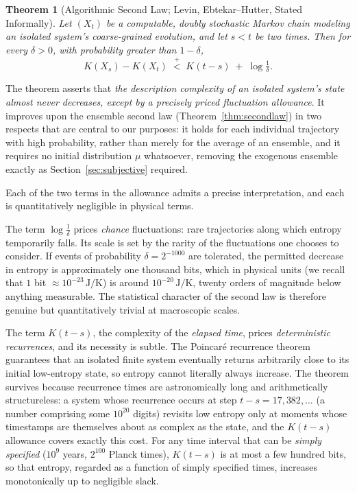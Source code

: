\documentclass[10pt]{article}
\newtheorem{theorem}{Theorem}[section]
\theoremstyle{definition}
\theoremstyle{remark}
\newcommand{\plt}{\mathrel{\stackrel{+}{<}}}
\begin{document}
\begin{theorem}[Algorithmic Second Law; Levin, Ebtekar--Hutter, Stated Informally]
\label{thm:algsecond}
Let $(X_t)$ be a computable, doubly stochastic Markov chain modeling an isolated system's coarse-grained evolution, and let $s < t$ be two times. Then for every $\delta > 0$, with probability greater than $1 - \delta$,
\[
K(X_s) - K(X_t) \;\plt\; K(t - s) \;+\; \log \tfrac1\delta .
\]
\end{theorem}

The theorem asserts that \emph{the description complexity of an isolated system's state almost never decreases, except by a precisely priced fluctuation allowance}. It improves upon the ensemble second law (Theorem~\ref{thm:secondlaw}) in two respects that are central to our purposes: it holds for each individual trajectory with high probability, rather than merely for the average of an ensemble, and it requires no initial distribution $\mu$ whatsoever, removing the exogenous ensemble exactly as Section~\ref{sec:subjective} required.

Each of the two terms in the allowance admits a precise interpretation, and each is quantitatively negligible in physical terms.

The term $\log\frac1\delta$ prices \emph{chance} fluctuations: rare trajectories along which entropy temporarily falls. Its scale is set by the rarity of the fluctuations one chooses to consider. If events of probability $\delta = 2^{-1000}$ are tolerated, the permitted decrease in entropy is approximately one thousand bits, which in physical units (we recall that $1$ bit $\approx 10^{-23}\,\mathrm{J/K}$) is around $10^{-20}\,\mathrm{J/K}$, twenty orders of magnitude below anything measurable. The statistical character of the second law is therefore genuine but quantitatively trivial at macroscopic scales.

The term $K(t-s)$, the complexity of the \emph{elapsed time}, prices \emph{deterministic recurrences}, and its necessity is subtle. The Poincar\'e recurrence theorem guarantees that an isolated finite system eventually returns arbitrarily close to its initial low-entropy state, so entropy cannot literally always increase. The theorem survives because recurrence times are astronomically long and arithmetically structureless: a system whose recurrence occurs at step $t - s = 17{,}382{,}\dots$ (a number comprising some $10^{20}$ digits) revisits low entropy only at moments whose timestamps are themselves about as complex as the state, and the $K(t-s)$ allowance covers exactly this cost. For any time interval that can be \emph{simply specified} ($10^9$ years, $2^{100}$ Planck times), $K(t-s)$ is at most a few hundred bits, so that entropy, regarded as a function of simply specified times, increases monotonically up to negligible slack.
\end{document}
